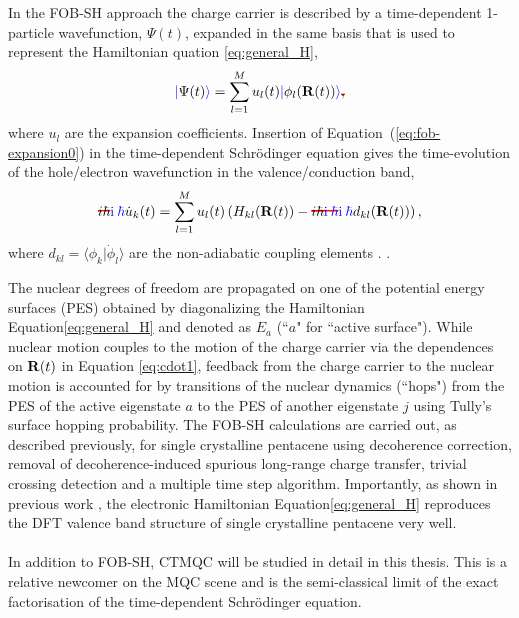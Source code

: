 \\\\
In the FOB-SH approach the charge carrier is described by a time-dependent 1-particle wavefunction, $\Psi(t)$,
expanded in the same basis that is used to represent the Hamiltonian quation \eqref{eq:general_H},
\begin{equation}
	\madd{|}\Psi(t)\madd{\rangle}  = \sum\limits_{l=1}^{M} u_l (t) \madd{|}\phi_{l} ({\bf R}(t))\madd{\rangle}\mremove{,} \label{eq:fob-expansion0}
\end{equation}
where $u_l$ are the expansion coefficients. Insertion of Equation~(\ref{eq:fob-expansion0}) in the
time-dependent Schr\"{o}dinger equation gives the time-evolution of the hole/electron wavefunction in the
valence/conduction band,
\begin{equation}
	\mremove{i \hbar}\madd{\im \: \hbar}\dot{u}_{k}(t) = \sum\limits_{l=1}^{M}{u}_{l}(t)\left({H}_{kl}({\bf R}(t)) - \mremove{\mremove{i \hbar}\madd{\im \: \hbar}} \madd{\im \: \hbar} d_{kl}({\bf R}(t)) \right) \label{eq:cdot1},
\end{equation}
where $d_{kl} \!=\! \langle \phi_k \vert \dot{\phi}_l \rangle$ are the non-adiabatic coupling elements . \cite{Carof2017FSSH_inline, FOB-SH_Spencer_inline}.

The nuclear degrees of freedom are propagated on one of the potential energy surfaces (PES) obtained by diagonalizing the
Hamiltonian Equation\eqref{eq:general_H} and denoted as $E_a$ (``$a$" for ``active surface"). While nuclear motion
couples to the motion of the charge carrier via the dependences on ${\bf R}(t)$ in Equation \eqref{eq:cdot1}, feedback
from the charge carrier to the nuclear motion is accounted for by transitions of the nuclear dynamics (``hops") from
the PES of the active eigenstate $a$ to the PES of another eigenstate $j$ using Tully's surface hopping probability.\cite{FSSH_orig}
The FOB-SH calculations are carried out, as described previously, for single crystalline pentacene\cite{Giannini2020} using  decoherence correction, removal of decoherence-induced spurious long-range charge transfer, trivial crossing detection
and a multiple time step algorithm. Importantly, as shown in previous work \cite{gajdos_ultrafast_2014}, the electronic Hamiltonian Equation\eqref{eq:general_H}
reproduces the DFT valence band structure of single crystalline pentacene\cite{Giannini2020} very well.
\\\\
In addition to FOB-SH, CTMQC will be studied in detail in this thesis. This is a relative newcomer on the MQC scene and is the semi-classical limit of the exact factorisation of the time-dependent Schr\"odinger equation.
